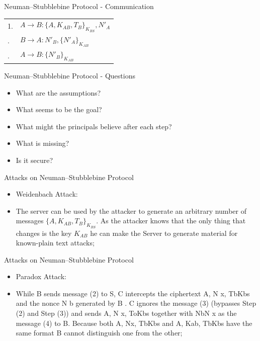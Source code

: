 \documentclass[12pt,table,xcolor={dvipsnames}]{beamer}
\begin{document}
\begin{frame}{Neuman–Stubblebine Protocol - Communication}
\begin{table}[htdp]
\begin{center}
\begin{tabular}{ l l }
1. & $A\rightarrow B: \{A,K_{AB},T_{B}\}_{K_{BS}},N'_{A}$ \\\pause
2. & $B\rightarrow A: N'_{B},\{N'_{A}\}_{K_{AB}}$ \\\pause
3. & $A\rightarrow B: \{N'_{B}\}_{K_{AB}}$ 
\end{tabular}
\end{center}
\end{table}%
\end{frame}


\begin{frame}{Neuman–Stubblebine Protocol - Questions}
\begin{itemize}
\item What are the assumptions? \pause
\item What seems to be the goal?\pause 
\item What might the principals believe after each step?\pause
\item What is missing?\pause
\item Is it secure?
\end{itemize}
\end{frame}

\begin{frame}{Attacks on Neuman–Stubblebine Protocol}
\begin{itemize}
\item Weidenbach Attack:
\item The server can be used by the attacker to generate an arbitrary number of messages $\{A,K_{AB},T_{B}\}_{K_{BS}}$. As the attacker knows that the only thing that changes is the key $K_{AB}$ he can make the Server to generate material for known-plain text attacks;
\end{itemize}
\end{frame}

\begin{frame}{Attacks on Neuman–Stubblebine Protocol}
\begin{itemize}
\item Paradox Attack:
\item While B sends message (2) to S, C intercepts the ciphertext {A, N x, Tb}Kbs and the nonce N b generated by B . C ignores the message (3) (bypasses Step (2) and Step (3)) and sends {A, N x, To}Kbs together with {Nb}N x as the message (4) to B. Because both
{A, Nx, Tb}Kbs and {A, Kab, Tb}Kbs have the same format  B cannot distinguish one from the other;
\end{itemize}
\end{frame}
\end{document}
